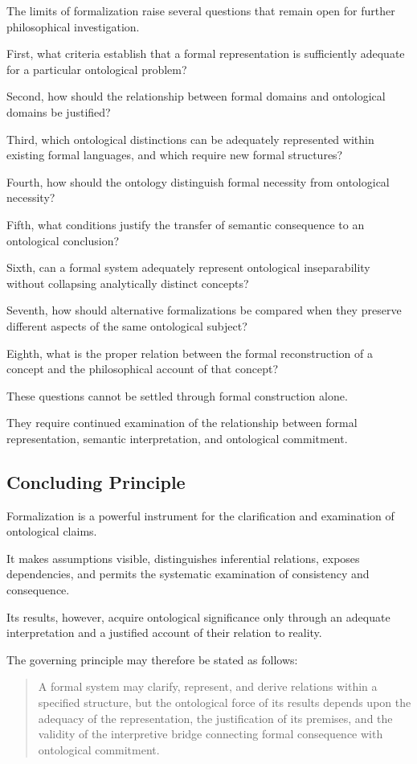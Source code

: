 The limits
of formalization
raise several
questions that
remain open
for further
philosophical investigation.

First, what
criteria establish
that a
formal representation
is sufficiently
adequate for
a particular
ontological problem?

Second, how
should the
relationship between
formal domains
and ontological
domains be
justified?

Third, which
ontological distinctions
can be
adequately represented
within existing
formal languages,
and which
require new
formal structures?

Fourth, how
should the
ontology distinguish
formal necessity
from ontological
necessity?

Fifth, what
conditions justify
the transfer
of semantic
consequence to
an ontological
conclusion?

Sixth, can
a formal
system adequately
represent ontological
inseparability without
collapsing analytically
distinct concepts?

Seventh, how
should alternative
formalizations be
compared when
they preserve
different aspects
of the same
ontological subject?

Eighth, what
is the
proper relation
between the
formal reconstruction
of a
concept and
the philosophical
account of
that concept?

These questions
cannot be
settled through
formal construction
alone.

They require
continued examination
of the
relationship between
formal representation,
semantic interpretation,
and ontological
commitment.

\subsection{Concluding Principle}

Formalization is
a powerful
instrument for
the clarification
and examination
of ontological
claims.

It makes
assumptions visible,
distinguishes inferential
relations, exposes
dependencies, and
permits the
systematic examination
of consistency
and consequence.

Its results,
however, acquire
ontological significance
only through
an adequate
interpretation and
a justified
account of
their relation
to reality.

The governing
principle may
therefore be
stated as
follows:

\begin{quote}
A formal system
may clarify,
represent, and
derive relations
within a
specified structure,
but the
ontological force
of its
results depends
upon the
adequacy of
the representation,
the justification
of its
premises, and
the validity
of the
interpretive bridge
connecting formal
consequence with
ontological commitment.
\end{quote}

